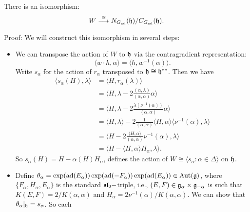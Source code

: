 \begin{dang}
    \begin{lemma}
        There is an isomorphism: 
\begin{equation}
     W \overset{\cong}{\longrightarrow} N_{G_{\text{ad}}}(\mathfrak{h})/C_{G_{\text{ad}}}(\mathfrak{h}).
\end{equation}
    \end{lemma}
\end{dang}
Proof: We will construct this isomorphism in several steps:
\begin{itemize}
    \item We can transpose the action of $W$ to $\mathfrak{h}$ via the contragradient representation:
    \begin{equation}
        \langle w\cdot h, \alpha\rangle = \langle h,w^{-1}(\alpha)\rangle.
    \end{equation}
    Write $s_\alpha$ for the action of $r_\alpha$ transposed to $\mathfrak{h}\cong\mathfrak{h}^{**}$. Then we have 
    \begin{equation}
        \begin{split}
           \langle s_\alpha(H),\lambda \rangle&= \langle H,r_\alpha(\lambda)\rangle\\
            &=\langle H, \lambda -2\frac{(\alpha,\lambda)}{(\alpha,\alpha)}\alpha\rangle\\
            &=\langle H, \lambda-2\frac{\lambda(\nu^{-1}(\alpha))}{(\alpha,\alpha)}\alpha\rangle\\
            &=\langle H,\lambda\rangle -2\frac{1}{(\alpha,\alpha)}\langle H,\alpha\rangle
            \langle \nu^{-1}(\alpha),\lambda \rangle\\
            &=\langle H-2\frac{\langle H,\alpha\rangle}{(\alpha,\alpha)}\nu^{-1}(\alpha),\lambda\rangle\\
            &=\langle H-\langle H,\alpha\rangle H_\alpha,\lambda\rangle.
        \end{split}
    \end{equation}
    So $s_\alpha(H)=H-\alpha(H)H_\alpha$, defines the action of $W\cong\langle s_\alpha:\alpha\in\Delta\rangle$ on
    $\mathfrak{h}$.
    \item Define $\theta_\alpha = \exp(\text{ad}(E_\alpha))\exp(\text{ad}(-F_\alpha))\exp(\text{ad}(E_\alpha))\in\text{Aut}(\mathfrak{g})$, where 
    $\{F_\alpha,H_\alpha, E_\alpha\}$ is the standard $\mathfrak{sl}_2-$triple, i.e., $(E,F)\in\mathfrak{g}_\alpha\times\mathfrak{g}_{-\alpha}$ is 
    such that $K(E,F)=2/K(\alpha,\alpha)$ and $H_\alpha = 2\nu^{-1}(\alpha)/K(\alpha,\alpha)$. 
    We can show that $\theta_\alpha|_{\mathfrak{h}}=s_\alpha$. So each 

\end{itemize}
